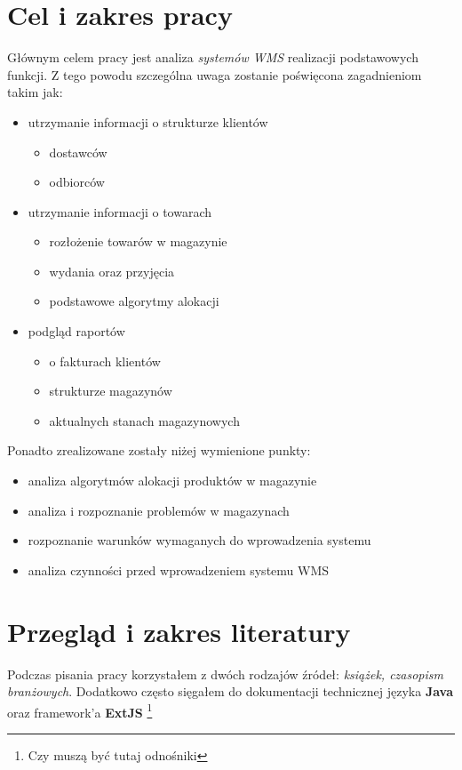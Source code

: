 \section{Cel i zakres pracy}
	\hspace{10pt}Głównym celem pracy jest analiza \emph{systemów WMS} realizacji 
	podstawowych funkcji. Z tego powodu szczególna uwaga zostanie poświęcona zagadnieniom
	takim jak:
	\begin{itemize}
		\item utrzymanie informacji o strukturze klientów
		\begin{itemize}
			\item dostawców
			\item odbiorców
		\end{itemize}
		\item utrzymanie informacji o towarach
		\begin{itemize}
			\item rozłożenie towarów w magazynie
			\item wydania oraz przyjęcia
			\item podstawowe algorytmy alokacji
		\end{itemize}
		\item podgląd raportów
		\begin{itemize}
			\item o fakturach klientów
			\item strukturze magazynów
			\item aktualnych stanach magazynowych
		\end{itemize}
	\end{itemize}
	
	Ponadto zrealizowane zostały niżej wymienione punkty:
	\begin{itemize}
		\item analiza algorytmów alokacji produktów w magazynie
		\item analiza i rozpoznanie problemów w magazynach
		\item rozpoznanie warunków wymaganych do wprowadzenia systemu
		\item analiza czynności przed wprowadzeniem systemu WMS
	\end{itemize}

\section{Przegląd i zakres literatury}
	\hspace{10pt}Podczas pisania pracy korzystałem z dwóch rodzajów źródeł: 
	\textit{książek, czasopism branżowych}. Dodatkowo często sięgałem do dokumentacji
	technicznej języka \textbf{Java} oraz framework'a \textbf{ExtJS} \footnote{Czy muszą być tutaj odnośniki}
